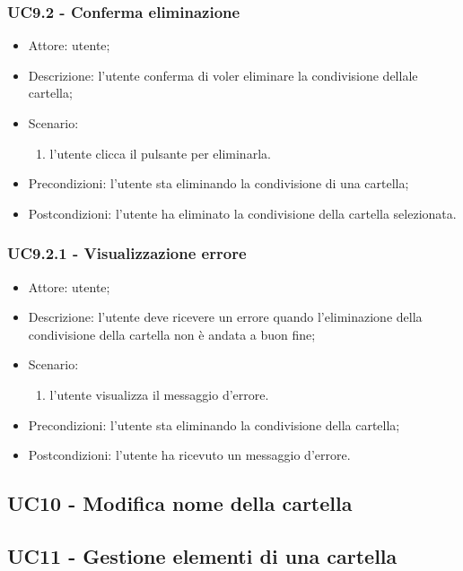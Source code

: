     \subsubsection{UC9.2 - Conferma eliminazione}
    \begin{itemize}
        \item Attore: utente;
        \item Descrizione: l'utente conferma di voler eliminare la condivisione dellale cartella;
        \item Scenario:
        \begin{enumerate}
        \item l'utente clicca il pulsante per eliminarla.
        \end{enumerate}
        \item Precondizioni: l'utente sta eliminando la condivisione di una cartella;
        \item Postcondizioni: l'utente ha eliminato la condivisione della cartella selezionata.
    \end{itemize}

    \subsubsection{UC9.2.1 - Visualizzazione errore }
    \begin{itemize}
        \item Attore: utente;
        \item Descrizione: l'utente deve ricevere un errore quando l'eliminazione della condivisione della cartella non è andata a buon fine;
        \item Scenario:
        \begin{enumerate}
        \item l'utente visualizza il messaggio d'errore.
        \end{enumerate}   
        \item Precondizioni: l'utente sta eliminando la condivisione della cartella;
        \item Postcondizioni: l'utente ha ricevuto un messaggio d'errore.
    \end{itemize}

    \subsection{UC10 - Modifica nome della cartella}

    \subsection{UC11 - Gestione elementi di una cartella}